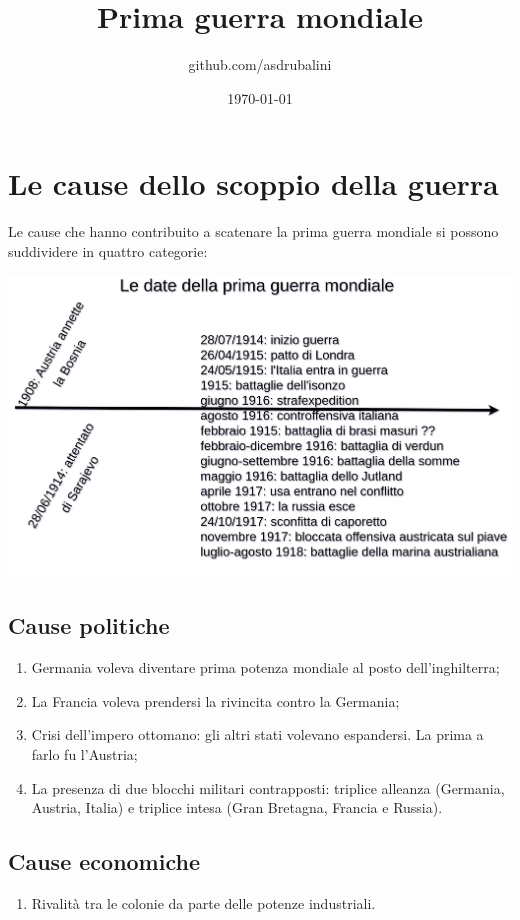 \documentclass{article}
\title{Prima guerra mondiale}
\author{github.com/asdrubalini}
\date{\today}
\begin{document}
\maketitle

\section{Le cause dello scoppio della guerra}
Le cause che hanno contribuito a scatenare la prima guerra mondiale si possono suddividere in quattro categorie:

\begin{center}
    \includegraphics[width=\textwidth]{date.png}
\end{center}

\subsection{Cause politiche}
\begin{enumerate}
    \item Germania voleva diventare prima potenza mondiale al posto dell'inghilterra;
    \item La Francia voleva prendersi la rivincita contro la Germania;
    \item Crisi dell'impero ottomano: gli altri stati volevano espandersi. La prima a farlo fu l'Austria;
    \item La presenza di due blocchi militari contrapposti: triplice alleanza (Germania, Austria, Italia) e triplice intesa (Gran Bretagna, Francia e Russia).
\end{enumerate}

\subsection{Cause economiche}
\begin{enumerate}
    \item Rivalità tra le colonie da parte delle potenze industriali.
\end{enumerate}
\end{document}

